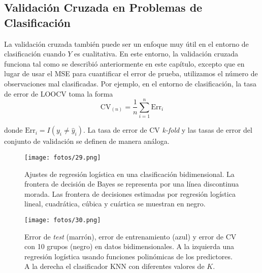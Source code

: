 \subsection{Validación Cruzada en Problemas de Clasificación}

La validación cruzada también puede ser un enfoque muy útil en el entorno de clasificación cuando $Y$ es cualitativa. En este entorno, la validación cruzada funciona tal como se describió anteriormente en este capítulo, excepto que en lugar de usar el MSE para cuantificar el error de prueba, utilizamos el número de observaciones mal clasificadas. Por ejemplo, en el entorno de clasificación, la tasa de error de LOOCV toma la forma
\begin{equation}
\text{CV}_{(n)} = \frac{1}{n} \sum_{i=1}^{n} \text{Err}_i
\end{equation}

\noindent donde $\text{Err}_i = I(y_i \neq \hat{y}_i)$. La tasa de error de CV \textit{k-fold} y las tasas de error del conjunto de validación se definen de manera análoga. \\

\begin{figure}[h]
\centering
\texttt{[image: fotos/29.png]}
\caption{Ajustes de regresión logística en una clasificación bidimensional. La frontera de decisión de Bayes se representa por una línea discontinua morada. Las frontera de decisiones estimadas por regresión logística lineal, cuadrática, cúbica y cuártica se muestran en negro.}
\label{fig:5.7}
\end{figure}

\begin{figure}[h]
\centering
\texttt{[image: fotos/30.png]}
\caption{Error de \textit{test} (marrón), error de entrenamiento (azul) y error de CV con 10 grupos (negro) en datos bidimensionales. A la izquierda una regresión logística usando funciones polinómicas de los predictores. A la derecha el clasificador KNN con diferentes valores de $K$.}
\label{fig:5.8}
\end{figure}


